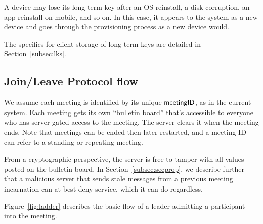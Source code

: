 A device may lose its long-term key after an OS reinstall, a disk corruption, an app reinstall on mobile, and so on. In this case, it appears to the system as a new device and goes through the provisioning process as a new device would.

The specifics for client storage of long-term keys are detailed in Section~\ref{subsec:lks}.

\subsection{Join/Leave Protocol flow}
We assume each meeting is identified by its unique ${\sf meetingID}$, as in the current system. Each meeting gets its own ``bulletin board'' that's accessible to everyone who has server-gated access to the meeting. The server clears it when the meeting ends. Note that meetings can be ended then later restarted, and a meeting ID can refer to a standing or repeating meeting.

From a cryptographic perspective, the server is free to tamper with all values posted on the bulletin board. In Section~\ref{subsec:secprop}, we describe further that a malicious server that sends stale messages from a previous meeting incarnation can at best deny service, which it can do regardless.

Figure~\ref{fig:ladder} describes the basic flow of a leader admitting a participant into the meeting.

\def\Bob{Bob}
\def\MMR{Zoom MMR}
\def\Keyserver{Zoom Keyserver}
\def\Alice{Alice}

